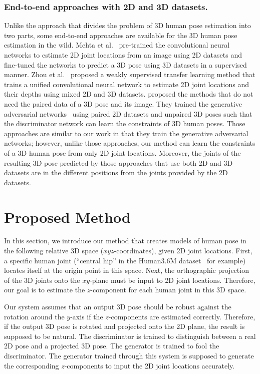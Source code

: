 \documentclass[runningheads]{llncs}
\begin{document}
\subsubsection{End-to-end approaches with 2D and 3D datasets.}
Unlike the approach that divides the problem of 3D human pose estimation into two parts, some end-to-end approaches are available for the 3D human pose estimation in the wild.
Mehta et al.~\cite{mpi-inf} pre-trained the convolutional neural networks to estimate 2D joint locations from an image using 2D datasets and fine-tuned the networks to predict a 3D pose using 3D datasets in a supervised manner.
Zhou et al.~\cite{zhou2017towards} proposed a weakly supervised transfer learning method that trains a unified convolutional neural network to estimate 2D joint locations and their depths using mixed 2D and 3D datasets. 
\cite{hmrKanazawa17,tung2017adversarial} proposed the methods that do not need the paired data of a 3D pose and its image.
They trained the generative adversarial networks~\cite{goodfellow2014generative} using paired 2D datasets and unpaired 3D poses such that the discriminator network can learn the constraints of 3D human poses.
Those approaches are similar to our work in that they train the generative adversarial networks; however, unlike those approaches, our method can learn the constraints of a 3D human pose from only 2D joint locations.
Moreover, the joints of the resulting 3D pose predicted by those approaches that use both 2D and 3D datasets are in the different positions from the joints provided by the 2D datasets.

\section{Proposed Method}
In this section, we introduce our method that creates models of human pose in the following relative 3D space ($xyz$-coordinates), given 2D joint locations.
First, a specific human joint (``central hip'' in the Human3.6M dataset~\cite{ionescu2014human3.6m} for example) locates itself at the origin point in this space.
Next, the orthographic projection of the 3D joints onto the $xy$-plane must be input to 2D joint locations.
Therefore, our goal is to estimate the $z$-component for each human joint in this 3D space.

Our system assumes that an output 3D pose should be robust against the rotation around the $y$-axis if the $z$-components are estimated correctly.
Therefore, if the output 3D pose is rotated and projected onto the 2D plane, the result is supposed to be natural.
The discriminator is trained to distinguish between a real 2D pose and a projected 3D pose.
The generator is trained to fool the discriminator.
The generator trained through this system is supposed to generate the corresponding $z$-components to input the 2D joint locations accurately.
\end{document}
